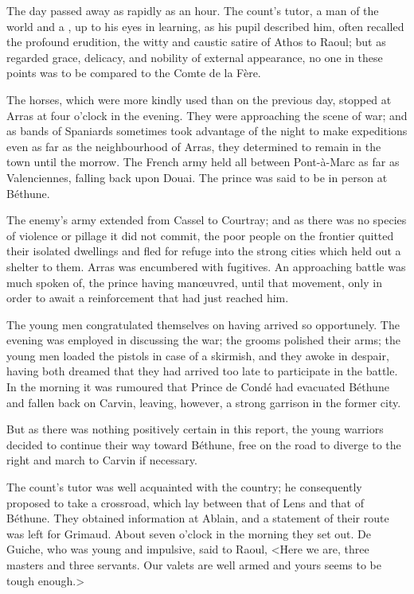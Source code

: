 The day passed away as rapidly as an hour. The count's tutor, a man of the world and a , up to his eyes in learning, as his pupil described him, often recalled the profound erudition, the witty and caustic satire of Athos to Raoul; but as regarded grace, delicacy, and nobility of external appearance, no one in these points was to be compared to the Comte de la Fère.

The horses, which were more kindly used than on the previous day, stopped at Arras at four o'clock in the evening. They were approaching the scene of war; and as bands of Spaniards sometimes took advantage of the night to make expeditions even as far as the neighbourhood of Arras, they determined to remain in the town until the morrow. The French army held all between Pont-à-Marc as far as Valenciennes, falling back upon Douai. The prince was said to be in person at Béthune.

The enemy's army extended from Cassel to Courtray; and as there was no species of violence or pillage it did not commit, the poor people on the frontier quitted their isolated dwellings and fled for refuge into the strong cities which held out a shelter to them. Arras was encumbered with fugitives. An approaching battle was much spoken of, the prince having manœuvred, until that movement, only in order to await a reinforcement that had just reached him.

The young men congratulated themselves on having arrived so opportunely. The evening was employed in discussing the war; the grooms polished their arms; the young men loaded the pistols in case of a skirmish, and they awoke in despair, having both dreamed that they had arrived too late to participate in the battle. In the morning it was rumoured that Prince de Condé had evacuated Béthune and fallen back on Carvin, leaving, however, a strong garrison in the former city.

But as there was nothing positively certain in this report, the young warriors decided to continue their way toward Béthune, free on the road to diverge to the right and march to Carvin if necessary.

The count's tutor was well acquainted with the country; he consequently proposed to take a crossroad, which lay between that of Lens and that of Béthune. They obtained information at Ablain, and a statement of their route was left for Grimaud. About seven o'clock in the morning they set out. De Guiche, who was young and impulsive, said to Raoul, <Here we are, three masters and three servants. Our valets are well armed and yours seems to be tough enough.>

